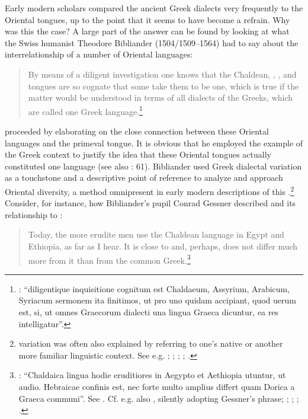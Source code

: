 Early modern scholars compared the ancient Greek dialects very frequently to the Oriental tongues, up to the point that it seems to have become a refrain. Why was this the case? A large part of the answer can be found by looking at what the Swiss humanist Theodore Bibliander (1504/1509–1564) had to say about the interrelationship of a number of Oriental languages:

\begin{quote}
By means of a diligent investigation one knows that the Chaldean, , , and  tongues are so cognate that some take them to be one, which is true if the matter would be understood in terms of all dialects of the Greeks, which are called one Greek language.\footnote{\citet[58]{Bibliander1542}: “diligentique inquisitione cognitum est Chaldaeum, Assyrium, Arabicum, Syriacum sermonem ita finitimos, ut pro uno quidam accipiant, quod uerum est, si, ut omnes Graecorum dialecti una lingua Graeca dicuntur, ea res intelligatur”.}
\end{quote}

\citet[58--59]{Bibliander1542} proceeded by elaborating on the close connection between these Oriental languages and the primeval  tongue. It is obvious that he employed the example of the Greek context to justify the idea that these Oriental tongues actually constituted one language (see also \citealt{Metcalf2013}: 61). Bibliander used Greek dialectal variation as a touchstone and a descriptive point of reference to analyze and approach Oriental diversity, a method omnipresent in early modern descriptions of this .\footnote{ variation was often also explained by referring to one’s native or another more familiar linguistic context. See e.g. \citet[41]{Purchas1613}; \citet[197]{Kircher1679}; \citet[b.1\textsc{\textsuperscript{v}}]{Le1696}; \citet[\textsc{i.}230, 4th sequence of pagination]{Chambers1728}; \citet[57--58]{Kals1752}.} Consider, for instance, how Bibliander’s pupil Conrad Gessner described  and its relationship to :

\begin{quote}
Today, the more erudite men use the Chaldean language in Egypt and Ethiopia, as far as I hear. It is close to  and, perhaps, does not differ much more from it than  from the common Greek.\footnote{\citet[15\textsc{\textsuperscript{r}}]{Gessner1555}: “Chaldaica lingua hodie eruditiores in Aegypto et Aethiopia utuntur, ut audio. Hebraicae confinis est, nec forte multo amplius differt quam Dorica a Graeca communi”. See \citet[43]{Peters1970}. Cf. e.g. also \citet[325]{Rocca1591}, silently adopting Gessner’s phrase; \citet[459]{Saumaise1643a}; \citet[88]{Bagnati1732}; \citet[24]{Wesley1736}; \citet[22]{Eichhorn1780}.}
\end{quote}

